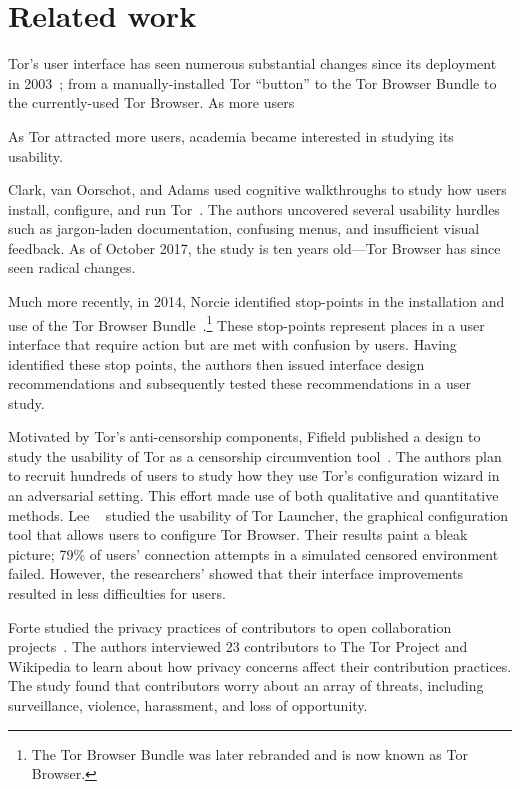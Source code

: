 \section{Related work}
\label{sec:related-work}

Tor's user interface has seen numerous substantial changes since its deployment
in 2003~\cite{Syverson2005a}; from a manually-installed Tor ``button'' to the
Tor Browser Bundle to the currently-used Tor Browser.  As more users 

As Tor attracted more
users, academia became interested in studying its usability.

Clark, van Oorschot, and Adams used cognitive walkthroughs to study how users
install, configure, and run Tor~\cite{Clark2007a}.  The authors uncovered
several usability hurdles such as jargon-laden documentation, confusing menus,
and insufficient visual feedback.  As of October 2017, the study is ten years
old---Tor Browser has since seen radical changes.

Much more recently, in 2014, Norcie \ea identified stop-points in the
installation and use of the Tor Browser Bundle~\cite{Norcie2014a}.\footnote{The
Tor Browser Bundle was later rebranded and is now known as Tor Browser.}  These
stop-points represent places in a user interface that require action but are met
with confusion by users.  Having identified these stop points, the authors then
issued interface design recommendations and subsequently tested these
recommendations in a user study.

Motivated by Tor's anti-censorship components, Fifield \ea published a design to
study the usability of Tor as a censorship circumvention
tool~\cite{Fifield2015a}.  The authors plan to recruit hundreds of users to
study how they use Tor's configuration wizard in an adversarial setting.  This
effort made use of both qualitative and quantitative methods.  Lee
\ea~\cite{Lee2017a} studied the usability of Tor Launcher, the graphical
configuration tool that allows users to configure Tor Browser.  Their results
paint a bleak picture; 79\% of users' connection attempts in a simulated
censored environment failed.  However, the researchers' showed that their
interface improvements resulted in less difficulties for users.

Forte \ea studied the privacy practices of contributors to open collaboration
projects~\cite{Forte2017a}.  The authors interviewed 23 contributors to The Tor
Project and Wikipedia to learn about how privacy concerns affect their
contribution practices.  The study found that contributors worry about an array
of threats, including surveillance, violence, harassment, and loss of
opportunity.

